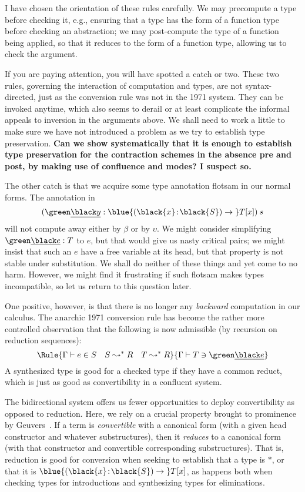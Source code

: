 \documentclass[natbib]{article}
\newcommand{\type}{\ast}
\newcommand{\hb}{\!:\!}
\newcommand{\PI}[2]{\blue{(\black{#1}\hb \black{#2})\to\;}}
\begin{document}
I have chosen the orientation of these rules carefully. We may precompute a type before checking it, e.g., ensuring that a type has the form of a function type before checking an abstraction; we may post-compute the type of a function being applied, so that it reduces to the form of a function type, allowing us to check the argument.

If you are paying attention, you will have spotted a catch or two. These two rules, governing the interaction of computation and types, are not syntax-directed, just as the conversion rule was not in the 1971 system. They can be invoked anytime, which also seems to derail or at least complicate the informal appeals to inversion in the arguments above. We shall need to work a little to make sure we have not introduced a problem as we try to establish type preservation. \textbf{Can we show systematically that it is enough to establish type preservation for the contraction schemes in the absence pre and post, by making use of confluence and modes? I suspect so.}

The other catch is that we acquire some type annotation flotsam in our normal forms. The annotation in
\[
  (\el y : \PI xS T[x])\:s
\]
will not compute away either by $\beta$ or by $\upsilon$. We might consider simplifying $\el e : T$ to $e$,
but that would give us nasty critical pairs; we might insist that such an $e$ have a free variable at its head, but that property is not stable under substitution. We shall do neither of these things and yet come to no harm.
However, we might find it frustrating if such flotsam makes types incompatible, so let us return to this question later.

One positive, however, is that there is no longer any \emph{backward} computation in our calculus. The anarchic 1971 conversion rule has become the rather more controlled observation that the following is now admissible (by recursion on reduction sequences):
\[\Rule{\SYN\Gamma eS \quad S\leadsto^\ast R \quad T\leadsto^\ast R}
       {\CHK\Gamma T{\el e}}
\]
A synthesized type is good for a checked type if they have a common reduct, which is just as good as convertibility in a confluent system.

The bidirectional system offers us fewer opportunities to deploy convertibility as opposed to reduction. Here, we rely on a crucial property brought to prominence by Geuvers~\cite{geuvers:dunnoyet}. If a term is \emph{convertible} with a canonical form (with a given head constructor and whatever substructures), then it \emph{reduces} to a canonical form (with that constructor and convertible corresponding substructures). That is, reduction is good for conversion when seeking to establish that a type is $\type$, or that it is $\PI xS T[x]$,
as happens both when checking types for introductions and synthesizing types for eliminations.



\end{document}
